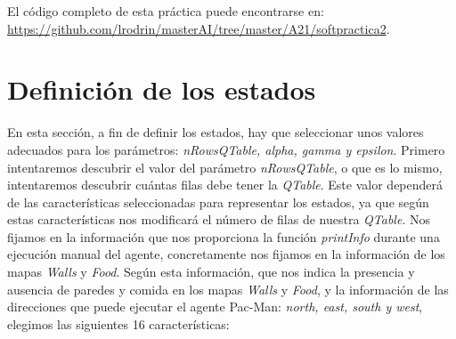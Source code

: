 \documentclass[11pt]{exam}
\begin{document}
El código completo de esta práctica puede encontrarse en: \url{https://github.com/lrodrin/masterAI/tree/master/A21/softpractica2}.

\section{Definición de los estados}\label{estados}

En esta sección, a fin de definir los estados, hay que seleccionar unos valores adecuados para los parámetros: \textit{nRowsQTable, alpha, gamma y epsilon}. Primero intentaremos descubrir el valor del parámetro \textit{nRowsQTable}, o que es lo mismo, intentaremos descubrir cuántas filas debe tener la \textit{QTable}. Este valor dependerá de las características seleccionadas para representar los estados, ya que según estas características nos modificará el número de filas de nuestra \textit{QTable}. Nos fijamos en la información que nos proporciona la función \textit{printInfo} durante una ejecución manual del agente, concretamente nos fijamos en la información de los mapas \textit{Walls} y \textit{Food}. Según esta información, que nos indica la presencia y ausencia de paredes y comida en los mapas \textit{Walls} y \textit{Food}, y la información de las direcciones que puede ejecutar el agente Pac-Man: \textit{north, east, south y west}, elegimos las siguientes 16 características:

\begin{parcolumns}{2}
	\colplacechunks
\end{parcolumns}
\vspace*{3mm}
\end{document}
